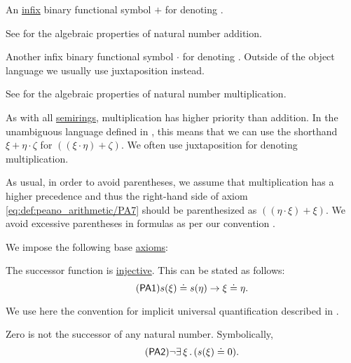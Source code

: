 \begin{definition}
\begin{thmenum}[series=def:peano_arithmetic]
     An \hyperref[rem:first_order_formula_conventions/infix]{infix} binary functional symbol \( + \) for denoting .

    See  for the algebraic properties of natural number addition.

     Another infix binary functional symbol \( \cdot \) for denoting . Outside of the object language we usually use juxtaposition instead.

    See  for the algebraic properties of natural number multiplication.

    As with all \hyperref[def:semiring]{semirings}, multiplication has higher priority than addition. In the unambiguous language defined in , this means that we can use the shorthand \( \xi + \eta \cdot \zeta \) for \( ((\xi \cdot \eta) + \zeta) \). We often use juxtaposition for denoting multiplication.
  \end{thmenum}

  As usual, in order to avoid parentheses, we assume that multiplication has a higher precedence and thus the right-hand side of axiom \eqref{eq:def:peano_arithmetic/PA7} should be parenthesized as \( ((\eta \cdot \xi) + \xi) \). We avoid excessive parentheses in formulas as per our convention .

  We impose the following base \hyperref[def:first_order_theory]{axioms}:
  \begin{thmenum}[resume=def:peano_arithmetic]
     The successor function is \hyperref[thm:function_invertibility_categorical/nonempty_left_invertible]{injective}. This can be stated as follows:
    \begin{equation}\label{eq:def:peano_arithmetic/PA1}\tag{\logic{PA1}}
      s(\xi) \doteq s(\eta) \rightarrow \xi \doteq \eta.
    \end{equation}

    We use here the convention for implicit universal quantification described in .

     Zero is not the successor of any natural number. Symbolically,
    \begin{equation}\label{eq:def:peano_arithmetic/PA2}\tag{\logic{PA2}}
      \neg \qexists \xi (s(\xi) \doteq 0).
    \end{equation}


\end{thmenum}
\end{definition}
